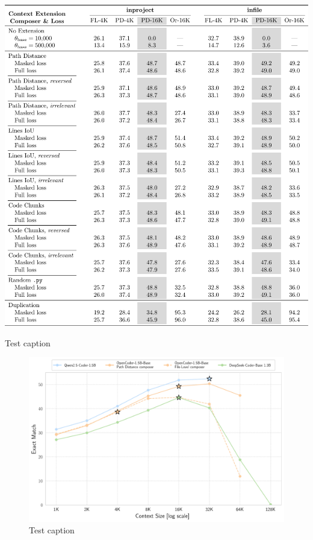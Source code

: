 \begin{table}[htbp]
    \centering
    \includegraphics[width=\textwidth]{tables/rq-b-gradient-masking.pdf}
    \caption{Test caption}\label{tab:ocoder-gradient-masking}
\end{table}

\begin{figure}[ht]
    \centering
    \includegraphics[width=\textwidth]{figures/beyond-training-window-infile.pdf}
    \caption{Test caption}\label{fig:beyond-training-window-infile}
\end{figure}
